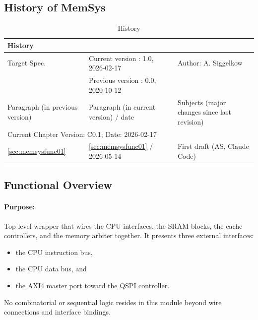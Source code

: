 \subsection{History of MemSys}
\begin{table}[H]
\caption{History}
\label{tab:memsyshistory02}
\centering
\begin{tabularx}{\textwidth}{|X |X |X |}
  \hline
  \multicolumn{3}{|l|}{History} \\
  \hline
  \multicolumn{1}{|l}{Target Spec.} & \multicolumn{1}{l}{Current version : 1.0, 2026-02-17} & \multicolumn{1}{l|}{Author: A. Siggelkow}\\
  \multicolumn{1}{|l}{ } & \multicolumn{1}{l}{Previous version : 0.0, 2020-10-12} & \multicolumn{1}{l|}{ }\\
  \hline
  \hline
  Paragraph (in previous version) & Paragraph (in current version) / date & Subjects (major changes since last revision) \\
  \hline
  \hline
  \multicolumn{3}{|l|}{Current Chapter Version: C0.1; Date: 2026-02-17} \\
  \hline
  \ref{sec:memsysfunc01} & \ref{sec:memsysfunc01} / 2026-05-14 & First draft (AS, Claude Code) \\
  \hline
\end{tabularx}
\end{table}

\subsection{Functional Overview}
\label{subsec:memsysfunc01}

\paragraph{Purpose:}
Top-level wrapper that wires the CPU interfaces, the SRAM blocks, the cache controllers, and the memory arbiter together. It presents three external interfaces: 
\begin{itemize}
  \item the CPU instruction bus, 
  \item the CPU data bus, and 
  \item the AXI4 master port toward the QSPI controller.
\end{itemize}
No combinatorial or sequential logic resides in this module beyond wire connections and interface bindings.


